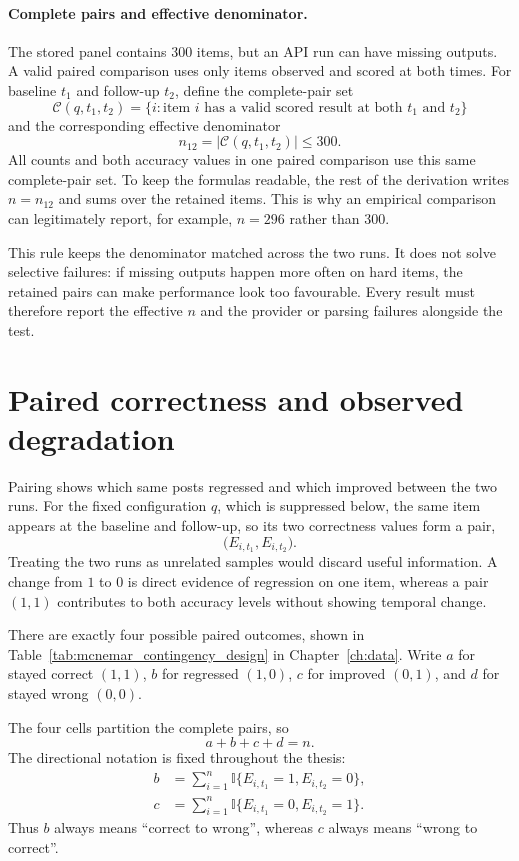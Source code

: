 \paragraph{Complete pairs and effective denominator.}

The stored panel contains 300 items, but an API run can have missing outputs. A valid paired comparison uses only items observed and scored at both times. For baseline \(t_1\) and follow-up \(t_2\), define the complete-pair set
\[
\mathcal{C}(q,t_1,t_2)
=
\{i:\text{item \(i\) has a valid scored result at both \(t_1\) and \(t_2\)}\}
\]
and the corresponding effective denominator
\[
n_{12}=|\mathcal{C}(q,t_1,t_2)|\le 300.
\]
All counts and both accuracy values in one paired comparison use this same complete-pair set. To keep the formulas readable, the rest of the derivation writes \(n=n_{12}\) and sums over the retained items. This is why an empirical comparison can legitimately report, for example, \(n=296\) rather than 300.

This rule keeps the denominator matched across the two runs. It does not solve selective failures: if missing outputs happen more often on hard items, the retained pairs can make performance look too favourable. Every result must therefore report the effective \(n\) and the provider or parsing failures alongside the test.

\section{Paired correctness and observed degradation}

Pairing shows which same posts regressed and which improved between the two runs. For the fixed configuration \(q\), which is suppressed below, the same item appears at the baseline and follow-up, so its two correctness values form a pair,
\[
\bigl(E_{i,t_1},E_{i,t_2}\bigr).
\]
Treating the two runs as unrelated samples would discard useful information. A change from \(1\) to \(0\) is direct evidence of regression on one item, whereas a pair \((1,1)\) contributes to both accuracy levels without showing temporal change.

There are exactly four possible paired outcomes, shown in Table~\ref{tab:mcnemar_contingency_design} in Chapter~\ref{ch:data}. Write \(a\) for stayed correct \((1,1)\), \(b\) for regressed \((1,0)\), \(c\) for improved \((0,1)\), and \(d\) for stayed wrong \((0,0)\).

The four cells partition the complete pairs, so
\begin{equation}
    a+b+c+d=n.
    \label{eq:paired-count-total}
\end{equation}
The directional notation is fixed throughout the thesis:
\begin{align}
    b
    &=
    \sum_{i=1}^{n}
    \mathbb{I}\{E_{i,t_1}=1,E_{i,t_2}=0\},
    \label{eq:regression-count}\\
    c
    &=
    \sum_{i=1}^{n}
    \mathbb{I}\{E_{i,t_1}=0,E_{i,t_2}=1\}.
    \label{eq:improvement-count}
\end{align}
Thus \(b\) always means ``correct to wrong'', whereas \(c\) always means ``wrong to correct''.

